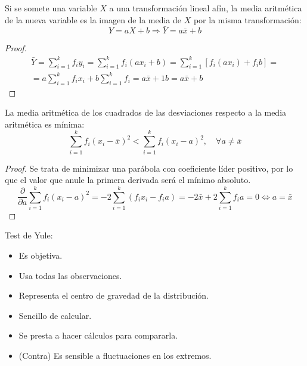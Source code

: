 \begin{prop}\label{prop:1.3}
    Si se somete una variable $X$ a una transformación lineal afín, la media aritmética de la nueva variable es la imagen de la media de $X$ por la misma transformación:
    \begin{equation*}
        Y=aX+b \Longrightarrow \bar{Y} = a \bar{x} + b
    \end{equation*}
\end{prop}
\begin{proof}
    \begin{multline*}
        \bar{Y} = \sum^k_{i=1}f_iy_i = \sum^k_{i=1}f_i(ax_i+b) = \sum^k_{i=1}[f_i(ax_i)+f_ib] = \\
        = a\sum^k_{i=1}f_ix_i + b\sum^k_{i=1}f_i = a\bar{x} + 1b = a\bar{x} + b 
    \end{multline*}
\end{proof}

\begin{prop}\label{prop:1.4}
    La media aritmética de los cuadrados de las desviaciones respecto a la media aritmética es mínima:
    \begin{equation*}
        \sum^k_{i=1} f_i(x_i-\bar{x})^2 < \sum^k_{i=1} f_i(x_i-a)^2, \quad \forall a \neq \bar{x}
    \end{equation*}
\end{prop}
\begin{proof}
    Se trata de minimizar una parábola con coeficiente líder positivo, por lo que el valor que anule la primera derivada será el mínimo absoluto.
    \begin{equation*}
        \frac{\partial}{\partial a} \sum^k_{i=1} f_i(x_i-a)^2 =  -2\sum_{i=1}^k (f_ix_i - f_ia) = -2\bar{x} +2\sum_{i=1}^k f_ia = 0 \Longleftrightarrow a=\bar{x}
    \end{equation*}
\end{proof}

\noindent Test de Yule:
\begin{itemize}
    \item Es objetiva.
    \item Usa todas las observaciones.
    \item Representa el centro de gravedad de la distribución.
    \item Sencillo de calcular.
    \item Se presta a hacer cálculos para compararla.
    \item (Contra) Es sensible a fluctuaciones en los extremos.
\end{itemize}

